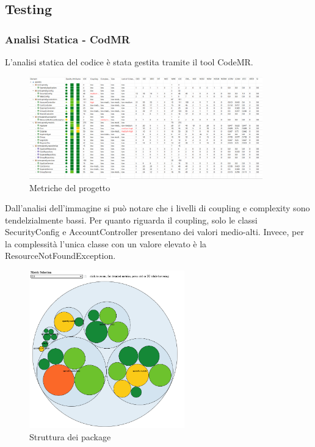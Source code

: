 \subsection{Testing}
\subsubsection{Analisi Statica - CodMR}

L'analisi statica del codice è stata gestita tramite il tool CodeMR.

\begin{figure}[H]
    \centering
    \includegraphics[width=0.9\textwidth]{images/CodeMR_graph1.png}
    \caption{Metriche del progetto}
    \label{fig:CodeMR_1}
\end{figure}

Dall'analisi dell'immagine si può notare che i livelli di coupling e complexity sono tendelzialmente bassi.
Per quanto riguarda il coupling, solo le classi SecurityConfig e AccountController presentano dei valori medio-alti. 
Invece, per la complessità l'unica classe con un valore elevato è la ResourceNotFoundException.

\begin{figure}[H]
    \centering
    \includegraphics[width=0.6\textwidth]{images/CodeMR_graph2.png}
    \caption{Struttura dei package}
    \label{fig:CodeMR_2}
\end{figure}


